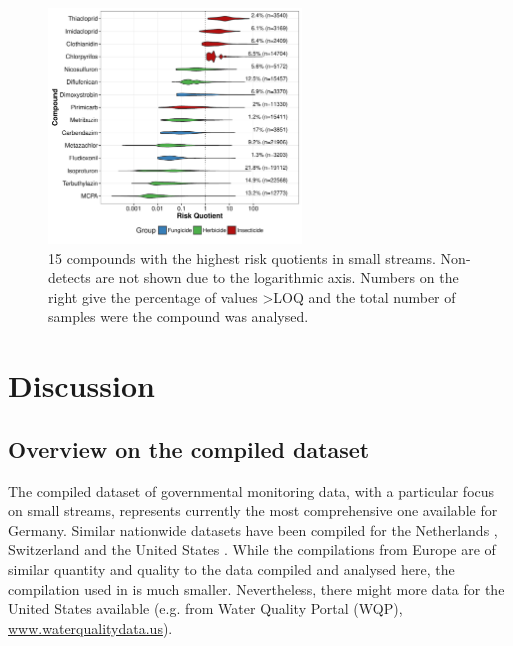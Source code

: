 \documentclass[journal=esthag,manuscript=article]{achemso}
\begin{document}
\begin{figure}[ht]
  \includegraphics[width=0.6\textwidth]{figure6.pdf}
  \caption{15 compounds with the highest risk quotients in small streams. Non-detects are not shown due to the logarithmic axis. Numbers on the right give the percentage of values \textgreater LOQ and the total number of samples were the compound was analysed.
  }
  \label{fig:fig6}
\end{figure}




\section{Discussion}
\subsection{Overview on the compiled dataset}
The compiled dataset of governmental monitoring data, with a particular focus on small streams, represents currently the most comprehensive one available for Germany.
Similar nationwide datasets have been compiled for the Netherlands \citep{vijver_spatial_2008}, Switzerland \citep{munz_pestizidmessungen_2011} and the United States \citep{stone2014pesticides}.
While the compilations from Europe are of similar quantity and quality to the  data compiled and analysed here, the compilation used in \citet{stone2014pesticides} is much smaller.
Nevertheless, there might more data for the United States available (e.g. from Water Quality Portal (WQP), \url{www.waterqualitydata.us}). 
\end{document}
